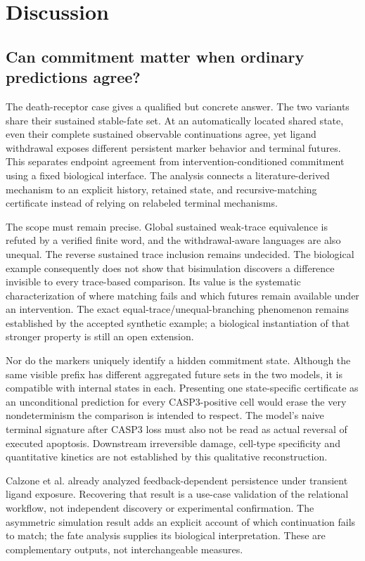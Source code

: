 \section{Discussion}\label{sec:discussion}

\subsection{Can commitment matter when ordinary predictions agree?}

The death-receptor case gives a qualified but concrete answer. The two
variants share their sustained stable-fate set. At an automatically located
shared state, even their complete sustained observable continuations agree,
yet ligand withdrawal exposes different persistent marker behavior and terminal
futures. This separates endpoint agreement from intervention-conditioned
commitment using a fixed biological interface. The analysis connects a
literature-derived mechanism to an explicit history, retained state, and
recursive-matching certificate instead of relying on relabeled terminal
mechanisms.

The scope must remain precise. Global sustained weak-trace equivalence is
refuted by a verified finite word, and the withdrawal-aware languages are
also unequal. The reverse sustained trace inclusion remains undecided.
The biological example consequently does not show that bisimulation discovers
a difference invisible to every trace-based comparison. Its value is the
systematic characterization of where matching fails and which futures remain
available under an intervention. The exact equal-trace/unequal-branching
phenomenon remains established by the accepted synthetic example; a biological
instantiation of that stronger property is still an open extension.

Nor do the markers uniquely identify a hidden commitment state. Although the
same visible prefix has different aggregated future sets in the two models,
it is compatible with \DRHistoryStates{} internal states in each. Presenting
one state-specific certificate as an unconditional prediction for every
CASP3-positive cell would erase the very nondeterminism the comparison is
intended to respect. The model's naive terminal signature after CASP3 loss
must also not be read as actual reversal of executed apoptosis. Downstream
irreversible damage, cell-type specificity and quantitative kinetics are not
established by this qualitative reconstruction.

Calzone et al. already analyzed feedback-dependent persistence under transient
ligand exposure.\cite{Calzone2010} Recovering that result is a use-case validation
of the relational workflow, not independent discovery or experimental
confirmation. The asymmetric simulation result adds an explicit account of
which continuation fails to match; the fate analysis supplies its biological
interpretation. These are complementary outputs, not interchangeable measures.

